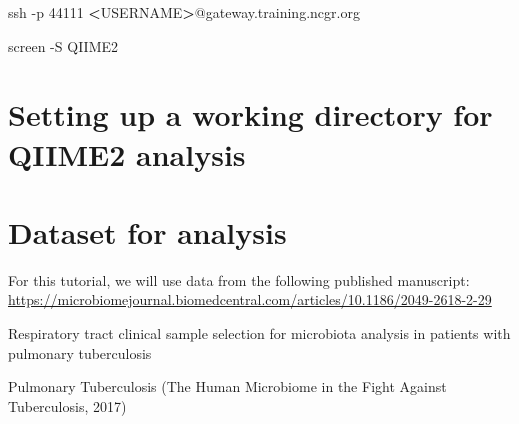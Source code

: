 \documentclass[
]{book}
\newenvironment{Shaded}{\begin{snugshade}}{\end{snugshade}}
\newcommand{\AttributeTok}[1]{\textcolor[rgb]{0.77,0.63,0.00}{#1}}
\newcommand{\BuiltInTok}[1]{#1}
\newcommand{\ExtensionTok}[1]{#1}
\newcommand{\FunctionTok}[1]{\textcolor[rgb]{0.00,0.00,0.00}{#1}}
\newcommand{\NormalTok}[1]{#1}
\newcommand{\OperatorTok}[1]{\textcolor[rgb]{0.81,0.36,0.00}{\textbf{#1}}}
\newcommand{\VariableTok}[1]{\textcolor[rgb]{0.00,0.00,0.00}{#1}}
\begin{document}
\begin{Shaded}
\begin{Highlighting}[]
\FunctionTok{ssh} \AttributeTok{{-}p}\NormalTok{ 44111 }\OperatorTok{\textless{}}\NormalTok{USERNAME}\OperatorTok{\textgreater{}}\NormalTok{@gateway.training.ncgr.org}

\ExtensionTok{screen} \AttributeTok{{-}S}\NormalTok{ QIIME2}
\end{Highlighting}
\end{Shaded}

\hypertarget{setting-up-a-working-directory-for-qiime2-analysis}{%
\section{Setting up a working directory for QIIME2 analysis}\label{setting-up-a-working-directory-for-qiime2-analysis}}

\begin{Shaded}
\end{Shaded}

\hypertarget{dataset-for-analysis}{%
\section{Dataset for analysis}\label{dataset-for-analysis}}

For this tutorial, we will use data from the following published manuscript:
\url{https://microbiomejournal.biomedcentral.com/articles/10.1186/2049-2618-2-29}

Respiratory tract clinical sample selection for microbiota analysis in patients with pulmonary tuberculosis

Pulmonary Tuberculosis (The Human Microbiome in the Fight Against Tuberculosis, 2017)
\end{document}
